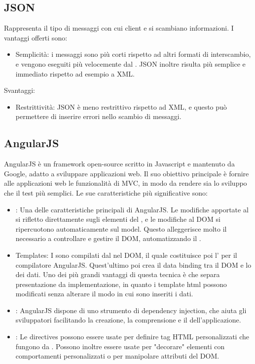 \subsection{JSON}
Rappresenta il tipo di messaggi con cui client e  si scambiano informazioni. I vantaggi offerti sono:
\begin{itemize}
\item Semplicità: i messaggi  sono più corti rispetto ad altri formati di interscambio, e vengono eseguiti più velocemente dal . JSON inoltre risulta più semplice e immediato rispetto ad esempio a XML.
\end{itemize}
Svantaggi:
\begin{itemize}
\item Restrittività: JSON è meno restrittivo rispetto ad XML, e questo può permettere di inserire errori nello scambio di messaggi.
\end{itemize}

\subsection{AngularJS}
AngularJS è un framework open-source scritto in Javascript e mantenuto da Google, adatto a sviluppare applicazioni web. Il suo obiettivo principale è fornire alle applicazioni web le funzionalità di MVC, in modo da rendere sia lo sviluppo che il test più semplici.
Le sue caratteristiche più significative sono:
\begin{itemize}
\item {}: Una delle caratteristiche principali di AngularJS. Le modifiche apportate al  si rifletto direttamente sugli elementi del , e le modifiche al DOM si ripercuotono automaticamente sul model. Questo alleggerisce molto il  necessario a controllare e gestire il DOM, automatizzando il .
\item Templates: I   sono compilati dal  nel DOM, il quale costituisce poi l' per il compilatore AngularJS. Quest'ultimo poi crea il data binding tra il DOM e lo  dei dati. Uno dei più grandi vantaggi di questa tecnica è che separa presentazione da implementazione, in quanto i template html possono modificati senza alterare il modo in cui sono inseriti i dati.
\item {}: AngularJS dispone di uno strumento di dependency injection, che aiuta gli sviluppatori facilitando la creazione, la comprensione e il  dell'applicazione.
\item {}: Le directives possono essere usate per definire tag HTML personalizzati che fungono da . Possono inoltre essere usate per "decorare" elementi con comportamenti personalizzati o per manipolare attributi del DOM.
\end{itemize}

